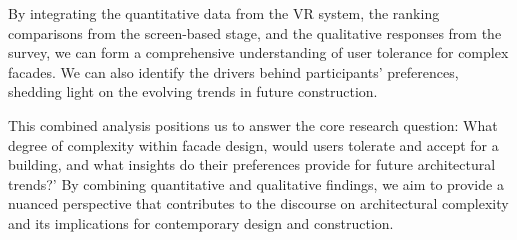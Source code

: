 By integrating the quantitative data from the VR system, the ranking comparisons from the screen-based stage, and the qualitative responses from the survey, we can form a comprehensive understanding of user tolerance for complex facades.
We can also identify the drivers behind participants' preferences, shedding light on the evolving trends in future construction.

This combined analysis positions us to answer the core research question: What degree of complexity within facade design, would users tolerate and accept for a building, and what insights do their preferences provide for future architectural trends?' By combining quantitative and qualitative findings, we aim to provide a nuanced perspective that contributes to the discourse on architectural complexity and its implications for contemporary design and construction.



